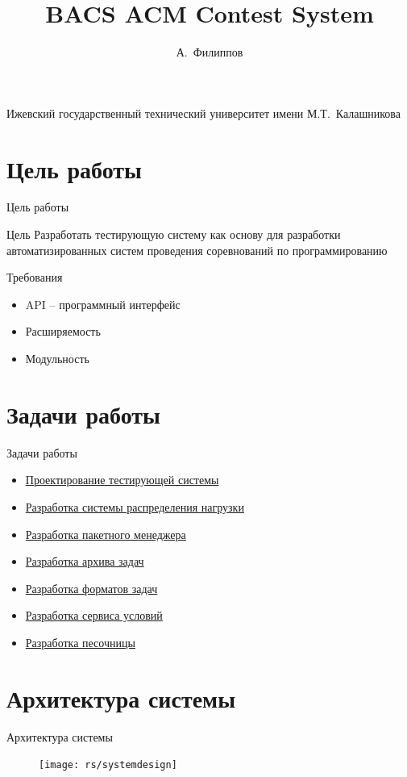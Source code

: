 \documentclass[xetex,mathserif,serif,10pt]{beamer}
\newenvironment{sframe}[2]{\section{#1}\begin{frame}[label=#2]{#1}}{\end{frame}}
\begin{document}
    \title[BACS]{BACS ACM Contest System}
    \author[Филиппов]{А.~Филиппов}
    \institute
    {
        Ижевский государственный технический университет имени М.Т.~Калашникова
    }

    

    \begin{sframe}{Цель работы}{target}
        \begin{block}{Цель}
            Разработать тестирующую систему как основу для разработки
            автоматизированных систем проведения соревнований по программированию
        \end{block}

        \begin{block}{Требования}
            \begin{itemize}
                \item API -- программный интерфейс
                \item Расширяемость
                \item Модульность
            \end{itemize}
        \end{block}
    \end{sframe}

    \begin{sframe}{Задачи работы}{problems}
        \begin{itemize}
            \item \hyperlink{systemdesign}{Проектирование тестирующей системы}
            \item \hyperlink{dcs}{Разработка системы распределения нагрузки}
            \item \hyperlink{bunsanpm}{Разработка пакетного менеджера}
            \item \hyperlink{bacsarchive}{Разработка архива задач}
            \item \hyperlink{bacsproblem}{Разработка форматов задач}
            \item \hyperlink{bacsstatementprovider}{Разработка сервиса условий}
            \item \hyperlink{sandbox}{Разработка песочницы}
        \end{itemize}
    \end{sframe}

    \begin{sframe}{Архитектура системы}{systemdesign}
        \begin{block}{}
            \begin{figure}[H]
                \centering
                \texttt{[image: rs/systemdesign]}
            \end{figure}
        \end{block}
    \end{sframe}
\end{document}
